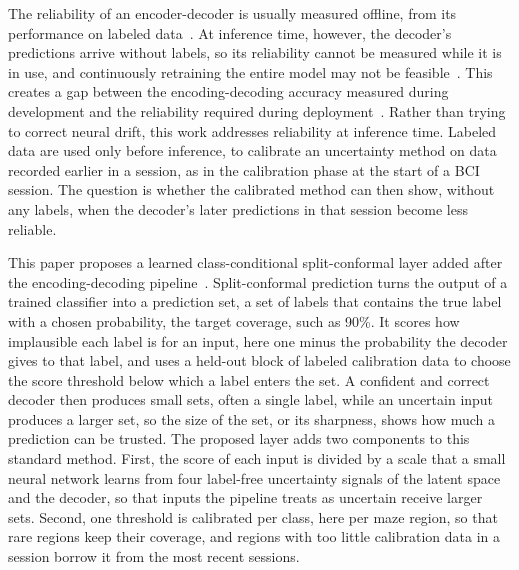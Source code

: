 \documentclass{article}
\begin{document}
The reliability of an encoder-decoder is usually measured offline, from its performance on labeled data~\cite{karpowicz2024a}. At inference time, however, the decoder's predictions arrive without labels, so its reliability cannot be measured while it is in use, and continuously retraining the entire model may not be feasible~\cite{fan2023a}. This creates a gap between the encoding-decoding accuracy measured during development and the reliability required during deployment~\cite{ovadia2019a}. Rather than trying to correct neural drift, this work addresses reliability at inference time. Labeled data are used only before inference, to calibrate an uncertainty method on data recorded earlier in a session, as in the calibration phase at the start of a BCI session. The question is whether the calibrated method can then show, without any labels, when the decoder's later predictions in that session become less reliable.

This paper proposes a learned class-conditional split-conformal layer added after the encoding-decoding pipeline~\cite{angelopoulos2022a}. Split-conformal prediction turns the output of a trained classifier into a prediction set, a set of labels that contains the true label with a chosen probability, the target coverage, such as 90\%. It scores how implausible each label is for an input, here one minus the probability the decoder gives to that label, and uses a held-out block of labeled calibration data to choose the score threshold below which a label enters the set. A confident and correct decoder then produces small sets, often a single label, while an uncertain input produces a larger set, so the size of the set, or its sharpness, shows how much a prediction can be trusted. The proposed layer adds two components to this standard method. First, the score of each input is divided by a scale that a small neural network learns from four label-free uncertainty signals of the latent space and the decoder, so that inputs the pipeline treats as uncertain receive larger sets. Second, one threshold is calibrated per class, here per maze region, so that rare regions keep their coverage, and regions with too little calibration data in a session borrow it from the most recent sessions.
\end{document}
